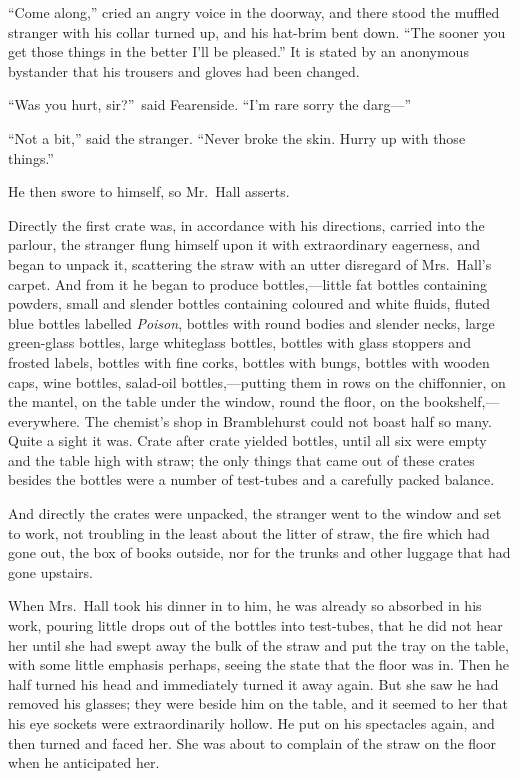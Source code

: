 {“Come along,” cried an angry voice in the doorway, and there stood the muffled stranger with his collar turned up, and his hat-brim bent down. “The sooner you get those things in the better I’ll be pleased.” It is stated by an anony\-mous bystander that his trousers and gloves had been changed.}

“Was you hurt, sir?”\ said Fearenside. “I’m rare sorry the darg—”

“Not a bit,” said the stranger. “Never broke the skin. Hurry up with those things.”

He then swore to himself, so Mr.\ Hall asserts.

Directly the first crate was, in accordance with his directions, carried into the parlour, the stranger flung himself upon it with extraordinary eagerness, and began to unpack it, scattering the straw with an utter disregard of Mrs.\ Hall’s carpet. And from it he began to produce bottles,—little fat bottles containing powders, small and slender bottles containing coloured and white fluids, fluted blue bottles labelled \emph{Poison}, bottles with round bodies and slender necks, large green-glass bottles, large whiteglass bottles, bottles with glass stoppers and frosted labels, bottles with fine corks, bottles with bungs, bottles with wooden caps, wine bottles, salad-oil bottles,—putting them in rows on the chiffonnier, on the mantel, on the table under the window, round the floor, on the bookshelf,—everywhere. The chemist’s shop in Bramblehurst could not boast half so many. Quite a sight it was. Crate after crate yielded bottles, until all six were empty and the table high with straw; the only things that came out of these crates besides the bottles were a number of test-tubes and a carefully packed balance.

And directly the crates were unpacked, the stranger went to the window and set to work, not troubling in the least about the litter of straw, the fire which had gone out, the box of books outside, nor for the trunks and other luggage that had gone upstairs.

When Mrs.\ Hall took his dinner in to him, he was already so absorbed in his work, pouring little drops out of the bottles into test-tubes, that he did not hear her until she had swept away the bulk of the straw and put the tray on the table, with some little emphasis perhaps, seeing the state that the floor was in. Then he half turned his head and immediately turned it away again. But she saw he had removed his glasses; they were beside him on the table, and it seemed to her that his eye sockets were extraordinarily hollow. He put on his spectacles again, and then turned and faced her. She was about to complain of the straw on the floor when he anticipated her.

